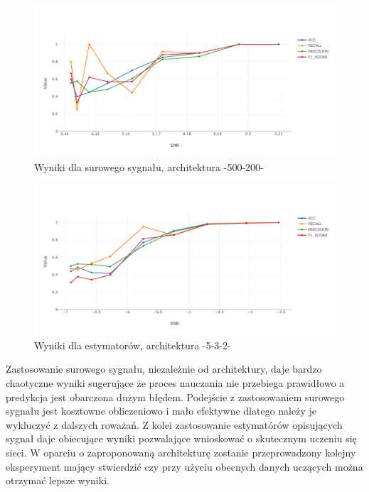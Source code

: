 \documentclass[12pt, a4paper, oneside]{article}
\begin{document}
	\begin{figure}[H]
		\includegraphics[width=16cm]{images/nn_full_signal_500_200.pdf}
		\caption{Wyniki dla surowego sygnału, architektura -500-200-}
	\end{figure}

	\begin{figure}[H]
		\includegraphics[width=16cm]{images/nn_small_532.pdf}
		\caption{Wyniki dla estymatorów, architektura -5-3-2-}
	\end{figure}

	Zastosowanie surowego sygnału, niezależnie od architektury, daje bardzo chaotyczne wyniki sugerujące że proces nauczania nie przebiega prawidłowo a predykcja jest obarczona dużym błędem. Podejście z zastosowaniem surowego sygnału jest kosztowne obliczeniowo i mało efektywne dlatego należy je wykluczyć z dalszych roważań. Z kolei zastosowanie estymatórów opisujących sygnał daje obiecujące wyniki pozwalające wnioskować o skutecznym uczeniu się sieci. W oparciu o zaproponowaną architekturę zostanie przeprowadzony kolejny eksperyment mający stwierdzić czy przy użyciu obecnych danych uczących można otrzymać lepsze wyniki.
	
\end{document}
